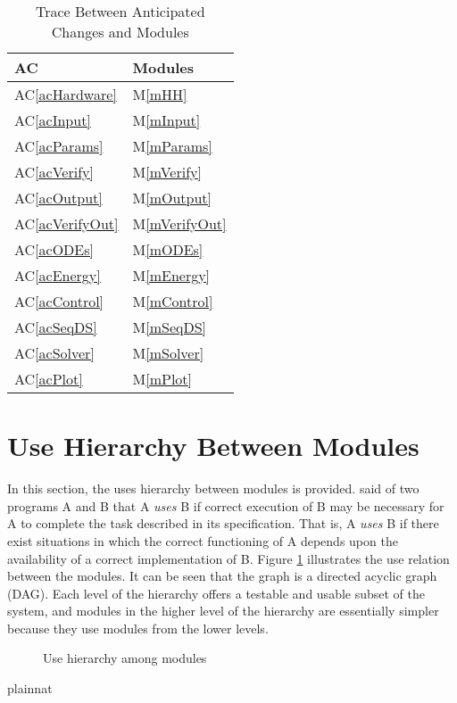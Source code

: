 \documentclass[12pt, titlepage]{article}
\newcommand{\acref}[1]{AC\ref{#1}}
\newcommand{\mref}[1]{M\ref{#1}}
\begin{document}
\begin{table}[H]
\centering
\begin{tabular}{p{} p{}}
\toprule
\textbf{AC} & \textbf{Modules}\\
\midrule
\acref{acHardware} & \mref{mHH}\\
\acref{acInput} & \mref{mInput}\\
\acref{acParams} & \mref{mParams}\\
\acref{acVerify} & \mref{mVerify}\\
\acref{acOutput} & \mref{mOutput}\\
\acref{acVerifyOut} & \mref{mVerifyOut}\\
\acref{acODEs} & \mref{mODEs}\\
\acref{acEnergy} & \mref{mEnergy}\\
\acref{acControl} & \mref{mControl}\\
\acref{acSeqDS} & \mref{mSeqDS}\\
\acref{acSolver} & \mref{mSolver}\\
\acref{acPlot} & \mref{mPlot}\\
\bottomrule
\end{tabular}
\caption{Trace Between Anticipated Changes and Modules}
\label{TblACT}
\end{table}

\section{Use Hierarchy Between Modules} \label{SecUse}

In this section, the uses hierarchy between modules is
provided. \citet{Parnas1978} said of two programs A and B that A {\em uses} B if
correct execution of B may be necessary for A to complete the task described in
its specification. That is, A {\em uses} B if there exist situations in which
the correct functioning of A depends upon the availability of a correct
implementation of B.  Figure \ref{FigUH} illustrates the use relation between
the modules. It can be seen that the graph is a directed acyclic graph
(DAG). Each level of the hierarchy offers a testable and usable subset of the
system, and modules in the higher level of the hierarchy are essentially simpler
because they use modules from the lower levels.

\begin{figure}[H]
\centering
\caption{Use hierarchy among modules}
\label{FigUH}
\end{figure}


 {plainnat}

\end{document}
